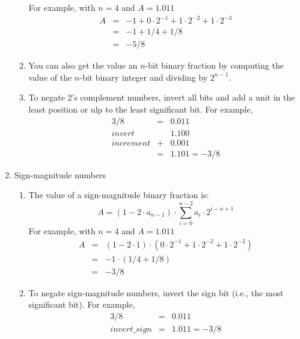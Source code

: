 \documentclass[times, twocolumn, 10pt]{article}
\begin{document}
\begin{enumerate}
\begin{enumerate}
    For example, with $n = 4$ and $A = 1.011$
    \begin{eqnarray*}
      A  & = & -1 + 0 \cdot 2^{-1} + 1 \cdot 2^{-2} + 1 \cdot 2^{-3} \\
      & = & -1 + 1/4 + 1/8 \\
      & = & -5/8
    \end{eqnarray*}
  \item You can also get the value an $n$-bit binary fraction 
    by computing the value of the $n$-bit binary integer and
    dividing by $2^{n-1}$. 
  \item To negate 2's complement numbers, invert all bits and 
    add a unit in the least position or ulp to the least significant
    bit. For example, 
    \begin{eqnarray*}
      3/8           & = & 0.011 \\
      invert        &   & 1.100 \\
      increment     & + & 0.001 \\
      & = & 1.101 = -3/8 
    \end{eqnarray*}
  \end{enumerate}

\item Sign-magnitude numbers
  \begin{enumerate}
  \item The value of a sign-magnitude binary fraction is:
    \[ A = (1 - 2 \cdot a_{n-1}) \cdot \sum_{i=0}^{n-2} a_{i} \cdot 2^{i - n + 1} \]
    For example, with $n = 4$ and $A = 1.011$
    \begin{eqnarray*}
      A  & = & (1 - 2 \cdot 1) \cdot (0 \cdot  2^{-1} + 1 \cdot 2^{-2} + 1 \cdot 2^{-3}) \\
      & = & -1 \cdot (1/4 + 1/8) \\
      & = & -3/8
    \end{eqnarray*}
  \item To negate sign-magnitude numbers, invert the sign bit (i.e., the most significant bit).
    For example, 
    \begin{eqnarray*}
      3/8           & = & 0.011 \\
      invert\_sign   & = & 1.011 = -3/8 
    \end{eqnarray*}
  \end{enumerate}


\end{enumerate}
\end{document}
